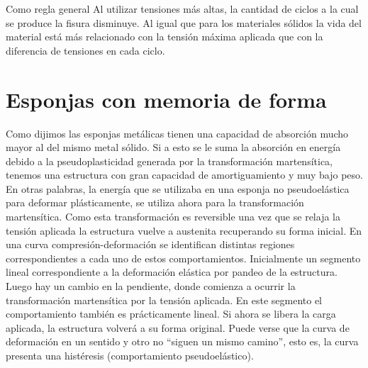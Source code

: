 \documentclass[a4paper,12pt,fleqn,twoside,openany]{book}
\begin{document}
Como regla general \cite{design} Al utilizar tensiones más altas, la cantidad de ciclos a la cual se produce la fisura disminuye. Al igual que para los 
materiales sólidos la vida del material está más relacionado con la tensión máxima aplicada que con la diferencia de tensiones en cada ciclo. 












\section{Esponjas con memoria de forma }
\label{sec:SMF}

Como dijimos las esponjas metálicas tienen una capacidad de absorción mucho mayor al del mismo metal sólido. Si a esto se le suma la absorción en energía 
debido a la pseudoplasticidad generada por la transformación martensítica, tenemos una estructura con gran capacidad de amortiguamiento y muy bajo 
peso. En otras palabras, la energía que se utilizaba en una esponja no pseudoelástica para deformar plásticamente, se utiliza ahora para la transformación
martensítica. Como esta transformación es reversible una vez que se relaja la tensión aplicada la estructura vuelve a austenita recuperando su forma 
inicial. En una curva compresión-deformación se identifican distintas regiones correspondientes a cada uno de estos comportamientos. Inicialmente un 
segmento lineal correspondiente a la deformación elástica por pandeo de la estructura. Luego hay un cambio en la pendiente, donde comienza a ocurrir 
la transformación martensítica por la tensión aplicada. En este segmento el comportamiento también es prácticamente lineal. Si ahora se libera la carga 
aplicada, la estructura volverá a su forma original. Puede verse que la curva de deformación en un sentido y otro no “siguen un mismo camino”, esto es, 
la curva presenta una histéresis (comportamiento pseudoelástico). 
\end{document}

